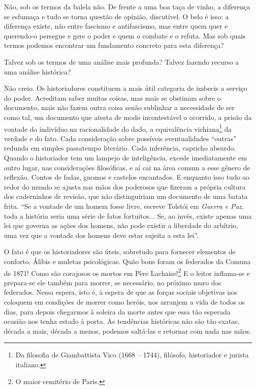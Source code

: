 Não, sob os termos da balela não. De frente a uma boa taça de vinho, a
diferença se esfumaça e tudo se torna questão de opinião, discutível. O
belo é isso: a diferença existe, não entre fascismo e antifascismo, mas
entre quem quer e querendo-o persegue e gere o poder e quem o combate e
o refuta. Mas sob quais termos podemos encontrar um fundamento concreto
para esta diferença?

Talvez sob os termos de uma análise mais profunda? Talvez fazendo
recurso a uma análise histórica?

Não creio. Os historiadores constituem a mais útil categoria de imbecis
a serviço do poder. Acreditam saber muitas coisas, mas mais se obstinam
sobre o documento, mais não fazem outra coisa senão sublinhar a
necessidade de ser como tal, um documento que atesta de modo
incontestável o ocorrido, a prisão da vontade do indivíduo na
racionalidade do dado, a equivalência vichiana\footnote{Da filosofia de Giambattista Vico (1668 -- 1744), filósofo,
  historiador e jurista italiano.} da verdade e do fato. Cada consideração sobre possíveis
eventualidades ``outras'' redunda em simples passatempo literário. Cada
inferência, capricho absurdo. Quando o historiador tem um lampejo de
inteligência, excede imediatamente em outro lugar, nas considerações
filosóficas, e aí cai na área comum a esse gênero de reflexão. Contos de
fadas, gnomos e castelos encantados. E enquanto isso tudo ao redor do
mundo se ajusta nas mãos dos poderosos que fizeram a própria cultura dos
caderninhos de revisão, que não distinguiriam um documento de uma batata
frita. ``Se a vontade de um homem fosse livre, escreve Tolstói em
\emph{Guerra e Paz}, toda a história seria uma série de fatos
fortuitos... Se, ao invés, existe apenas uma lei que governa as ações
dos homens, não pode existir a liberdade do arbítrio, uma vez que a
vontade dos homens deve estar sujeita a esta lei''.

O fato é que os historiadores são úteis, sobretudo para fornecer
elementos de conforto. Álibis e muletas psicológicas. Quão bons foram os
federados da Comuna de 1871! Como são corajosos os mortos em Père
Lachaise!\footnote{O maior cemitério de Paris.} E o leitor inflama-se e prepara-se ele também para
morrer, se necessário, no próximo muro dos federados. Nessa espera, isto
é, à espera de que as forças sociais objetivas nos coloquem em condições
de morrer como heróis, nos arranjem a vida de todos os dias, para depois
chegarmos à soleira da morte antes que essa tão esperada ocasião nos
tenha estado à porta. As tendências históricas não são tão exatas,
década a mais, década a menos, podemos saltá-las e retornar com nada nas
mãos.

